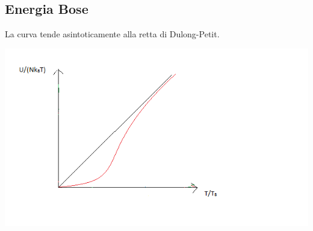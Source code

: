 \subsection{Energia Bose}
La curva tende asintoticamente alla retta di Dulong-Petit.
\begin{center}
\includegraphics[scale=1]{immagini/energia-bose.png}
\end{center}

